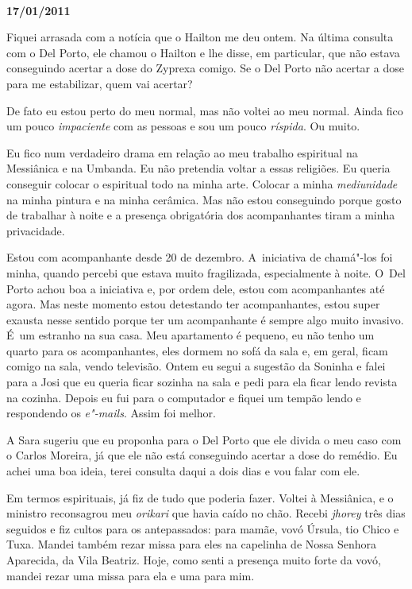 \begin{center}\asterisc{}​\end{center}

\begin{flushright}\textbf{}\end{flushright}

\begin{flushright}\textbf{17/01/2011}\end{flushright}


Fiquei arrasada com a notícia que o Hailton me deu ontem. Na última
consulta com o Del Porto, ele chamou o Hailton e lhe disse, em
particular, que não estava conseguindo acertar a dose do Zyprexa comigo.
Se o Del Porto não acertar a dose para me estabilizar, quem vai acertar?

De fato eu estou perto do meu normal, mas não voltei ao meu normal.
Ainda fico um pouco \emph{impaciente} com as pessoas e sou um pouco
\emph{ríspida}. Ou muito.

Eu fico num verdadeiro drama em relação ao meu trabalho espiritual na
Messiânica e na Umbanda. Eu não pretendia voltar a essas religiões. Eu
queria conseguir colocar o espiritual todo na minha arte. Colocar a
minha \emph{mediunidade} na minha pintura e na minha cerâmica. Mas não
estou conseguindo porque gosto de trabalhar à noite e a presença
obrigatória dos acompanhantes tiram a minha privacidade.

Estou com acompanhante desde 20 de dezembro. A~iniciativa de chamá"-los
foi minha, quando percebi que estava muito fragilizada, especialmente à
noite. O~Del Porto achou boa a iniciativa e, por ordem dele, estou com
acompanhantes até agora. Mas neste momento estou detestando ter
acompanhantes, estou super exausta nesse sentido porque ter um
acompanhante é sempre algo muito invasivo. É~um estranho na sua casa.
Meu apartamento é pequeno, eu não tenho um quarto para os acompanhantes,
eles dormem no sofá da sala e, em geral, ficam comigo na sala, vendo
televisão. Ontem eu segui a sugestão da Soninha e falei para a Josi que
eu queria ficar sozinha na sala e pedi para ela ficar lendo revista na
cozinha. Depois eu fui para o computador e fiquei um tempão lendo e
respondendo os \emph{e"-mails}. Assim foi melhor.

A Sara sugeriu que eu proponha para o Del Porto que ele divida o meu
caso com o Carlos Moreira, já que ele não está conseguindo acertar a
dose do remédio. Eu achei uma boa ideia, terei consulta daqui a dois
dias e vou falar com ele.

Em termos espirituais, já fiz de tudo que poderia fazer. Voltei à
Messiânica, e o ministro reconsagrou meu \emph{orikari} que havia caído
no chão. Recebi \emph{jhorey} três dias seguidos e fiz cultos para os
antepassados: para mamãe, vovó Úrsula, tio Chico e Tuxa. Mandei também
rezar missa para eles na capelinha de Nossa Senhora Aparecida, da Vila
Beatriz. Hoje, como senti a presença muito forte da vovó, mandei rezar
uma missa para ela e uma para mim.

